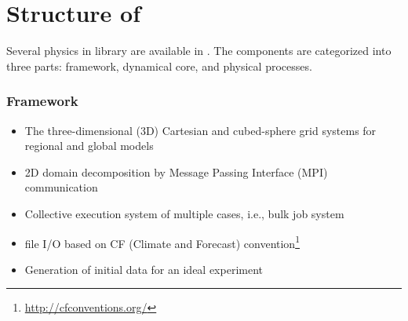 \section{Structure of \scaledg}  \label{subsec:sturcture_scale_rm}
Several physics in \scalelib library are available in \scaledg.
The components are categorized into three parts:
framework, dynamical core, and physical processes.

\subsubsection{Framework}
\begin{itemize}
 \item The three-dimensional (3D) Cartesian and cubed-sphere grid systems for regional and global models
 \item 2D domain decomposition by Message Passing Interface (MPI) communication
 \item Collective execution system of multiple cases, i.e., bulk job system
 \item \netcdf file I/O based on CF (Climate and Forecast) convention\footnote{\url{http://cfconventions.org/}}
 \item Generation of initial data for an ideal experiment
\end{itemize}

